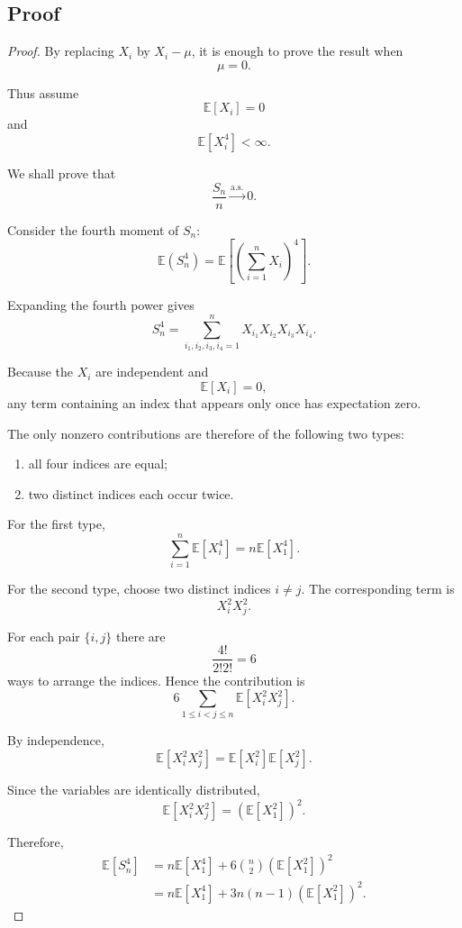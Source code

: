 \subsection{Proof}

\begin{proof}

By replacing $X_i$ by $X_i-\mu$, it is enough to prove the result
when
\[
\mu=0.
\]

Thus assume
\[
\mathbb{E}[X_i]=0
\]
and
\[
\mathbb{E}[X_i^4]<\infty.
\]

We shall prove that
\[
\frac{S_n}{n}
\xrightarrow{\mathrm{a.s.}}
0.
\]

Consider the fourth moment of $S_n$:
\[
\mathbb{E}(S_n^4)
=
\mathbb{E}
\left[
\left(
\sum_{i=1}^{n}X_i
\right)^4
\right].
\]

Expanding the fourth power gives
\[
S_n^4
=
\sum_{i_1,i_2,i_3,i_4=1}^{n}
X_{i_1}X_{i_2}X_{i_3}X_{i_4}.
\]

Because the $X_i$ are independent and
\[
\mathbb{E}[X_i]=0,
\]
any term containing an index that appears only once has expectation
zero.

The only nonzero contributions are therefore of the following two
types:

\begin{enumerate}
    \item all four indices are equal;
    \item two distinct indices each occur twice.
\end{enumerate}

For the first type,
\[
\sum_{i=1}^{n}
\mathbb{E}[X_i^4]
=
n\mathbb{E}[X_1^4].
\]

For the second type, choose two distinct indices $i\neq j$.
The corresponding term is
\[
X_i^2X_j^2.
\]

For each pair $\{i,j\}$ there are
\[
\frac{4!}{2!2!}=6
\]
ways to arrange the indices. Hence the contribution is
\[
6
\sum_{1\leq i<j\leq n}
\mathbb{E}[X_i^2X_j^2].
\]

By independence,
\[
\mathbb{E}[X_i^2X_j^2]
=
\mathbb{E}[X_i^2]
\mathbb{E}[X_j^2].
\]

Since the variables are identically distributed,
\[
\mathbb{E}[X_i^2X_j^2]
=
\left(
\mathbb{E}[X_1^2]
\right)^2.
\]

Therefore,
\[
\begin{aligned}
\mathbb{E}[S_n^4]
&=
n\mathbb{E}[X_1^4]
+
6\binom{n}{2}
\left(
\mathbb{E}[X_1^2]
\right)^2\\
&=
n\mathbb{E}[X_1^4]
+
3n(n-1)
\left(
\mathbb{E}[X_1^2]
\right)^2.
\end{aligned}
\]


\end{proof}

